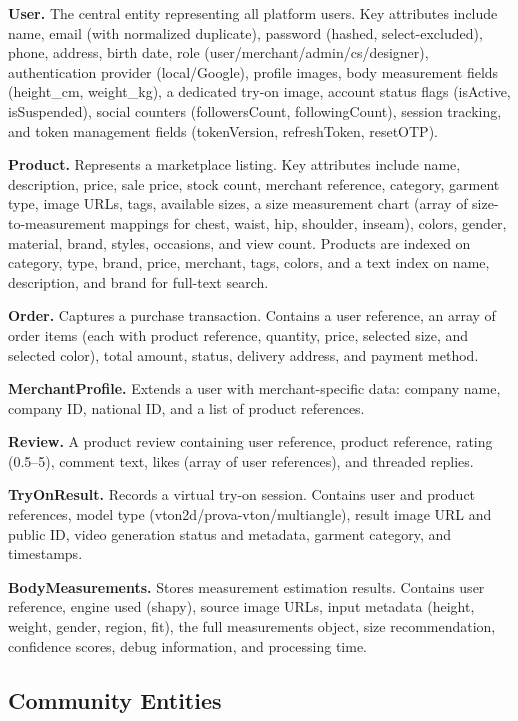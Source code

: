 \textbf{User.} The central entity representing all platform users. Key attributes include name, email (with normalized duplicate), password (hashed, select-excluded), phone, address, birth date, role (user/merchant/admin/cs/designer), authentication provider (local/Google), profile images, body measurement fields (height\_cm, weight\_kg), a dedicated try-on image, account status flags (isActive, isSuspended), social counters (followersCount, followingCount), session tracking, and token management fields (tokenVersion, refreshToken, resetOTP).

\textbf{Product.} Represents a marketplace listing. Key attributes include name, description, price, sale price, stock count, merchant reference, category, garment type, image URLs, tags, available sizes, a size measurement chart (array of size-to-measurement mappings for chest, waist, hip, shoulder, inseam), colors, gender, material, brand, styles, occasions, and view count. Products are indexed on category, type, brand, price, merchant, tags, colors, and a text index on name, description, and brand for full-text search.

\textbf{Order.} Captures a purchase transaction. Contains a user reference, an array of order items (each with product reference, quantity, price, selected size, and selected color), total amount, status, delivery address, and payment method.

\textbf{MerchantProfile.} Extends a user with merchant-specific data: company name, company ID, national ID, and a list of product references.

\textbf{Review.} A product review containing user reference, product reference, rating (0.5--5), comment text, likes (array of user references), and threaded replies.

\textbf{TryOnResult.} Records a virtual try-on session. Contains user and product references, model type (vton2d/prova-vton/multiangle), result image URL and public ID, video generation status and metadata, garment category, and timestamps.

\textbf{BodyMeasurements.} Stores measurement estimation results. Contains user reference, engine used (shapy), source image URLs, input metadata (height, weight, gender, region, fit), the full measurements object, size recommendation, confidence scores, debug information, and processing time.

\subsection{Community Entities}

